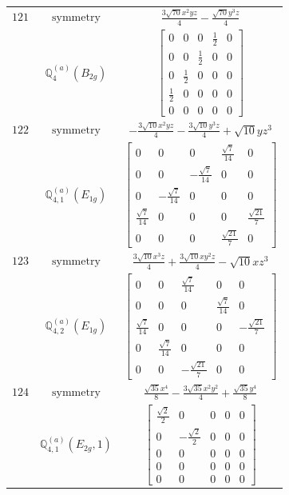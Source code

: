 \documentclass[fleqn,8pt,landscape]{jsarticle}
\begin{document}
\begin{longtable}{ccc}
$ 121 $ & $ \text{symmetry} $ & $ \frac{3 \sqrt{70} x^{2} y z}{4} - \frac{\sqrt{70} y^{3} z}{4} $ \\
$  $ & $ \mathbb{Q}_{4}^{(a)}(B_{2g}) $ & $ \begin{bmatrix} 0 & 0 & 0 & \frac{1}{2} & 0 \\ 0 & 0 & \frac{1}{2} & 0 & 0 \\ 0 & \frac{1}{2} & 0 & 0 & 0 \\ \frac{1}{2} & 0 & 0 & 0 & 0 \\ 0 & 0 & 0 & 0 & 0 \end{bmatrix} $ \\ \hline
$ 122 $ & $ \text{symmetry} $ & $ - \frac{3 \sqrt{10} x^{2} y z}{4} - \frac{3 \sqrt{10} y^{3} z}{4} + \sqrt{10} y z^{3} $ \\
$  $ & $ \mathbb{Q}_{4,1}^{(a)}(E_{1g}) $ & $ \begin{bmatrix} 0 & 0 & 0 & \frac{\sqrt{7}}{14} & 0 \\ 0 & 0 & - \frac{\sqrt{7}}{14} & 0 & 0 \\ 0 & - \frac{\sqrt{7}}{14} & 0 & 0 & 0 \\ \frac{\sqrt{7}}{14} & 0 & 0 & 0 & \frac{\sqrt{21}}{7} \\ 0 & 0 & 0 & \frac{\sqrt{21}}{7} & 0 \end{bmatrix} $ \\ \hline
$ 123 $ & $ \text{symmetry} $ & $ \frac{3 \sqrt{10} x^{3} z}{4} + \frac{3 \sqrt{10} x y^{2} z}{4} - \sqrt{10} x z^{3} $ \\
$  $ & $ \mathbb{Q}_{4,2}^{(a)}(E_{1g}) $ & $ \begin{bmatrix} 0 & 0 & \frac{\sqrt{7}}{14} & 0 & 0 \\ 0 & 0 & 0 & \frac{\sqrt{7}}{14} & 0 \\ \frac{\sqrt{7}}{14} & 0 & 0 & 0 & - \frac{\sqrt{21}}{7} \\ 0 & \frac{\sqrt{7}}{14} & 0 & 0 & 0 \\ 0 & 0 & - \frac{\sqrt{21}}{7} & 0 & 0 \end{bmatrix} $ \\ \hline
$ 124 $ & $ \text{symmetry} $ & $ \frac{\sqrt{35} x^{4}}{8} - \frac{3 \sqrt{35} x^{2} y^{2}}{4} + \frac{\sqrt{35} y^{4}}{8} $ \\
$  $ & $ \mathbb{Q}_{4,1}^{(a)}(E_{2g},1) $ & $ \begin{bmatrix} \frac{\sqrt{2}}{2} & 0 & 0 & 0 & 0 \\ 0 & - \frac{\sqrt{2}}{2} & 0 & 0 & 0 \\ 0 & 0 & 0 & 0 & 0 \\ 0 & 0 & 0 & 0 & 0 \\ 0 & 0 & 0 & 0 & 0 \end{bmatrix} $ \\ \hline

\end{longtable}
\end{document}

